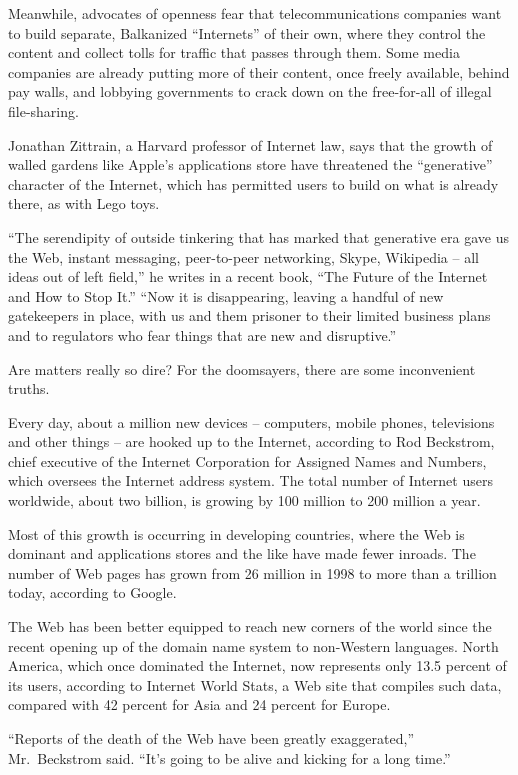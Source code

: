 ﻿\documentclass[12pt]{article}
\begin{document}
Meanwhile, advocates of openness fear that telecommunications companies want to build separate,
Balkanized ``Internets'' of their own, where they control the content and collect tolls for traffic
that passes through them. Some media companies are already putting more of their content, once
freely available, behind pay walls, and lobbying governments to crack down on the free-for-all of
illegal file-sharing.

Jonathan Zittrain, a Harvard professor of Internet law, says that the growth of walled gardens like
Apple's applications store have threatened the ``generative'' character of the Internet, which has
permitted users to build on what is already there, as with Lego toys.

``The serendipity of outside tinkering that has marked that generative era gave us the Web, instant
messaging, peer-to-peer networking, Skype, Wikipedia -- all ideas out of left field,'' he writes in
a recent book, ``The Future of the Internet and How to Stop It.'' ``Now it is disappearing, leaving
a handful of new gatekeepers in place, with us and them prisoner to their limited business plans and
to regulators who fear things that are new and disruptive.''

Are matters really so dire? For the doomsayers, there are some inconvenient truths.

Every day, about a million new devices -- computers, mobile phones, televisions and other things --
are hooked up to the Internet, according to Rod Beckstrom, chief executive of the Internet
Corporation for Assigned Names and Numbers, which oversees the Internet address system. The total
number of Internet users worldwide, about two billion, is growing by 100 million to 200 million a
year.

Most of this growth is occurring in developing countries, where the Web is dominant and applications
stores and the like have made fewer inroads. The number of Web pages has grown from 26 million in
1998 to more than a trillion today, according to Google.

The Web has been better equipped to reach new corners of the world since the recent opening up of
the domain name system to non-Western languages. North America, which once dominated the Internet,
now represents only 13.5 percent of its users, according to Internet World Stats, a Web site that
compiles such data, compared with 42 percent for Asia and 24 percent for Europe.

``Reports of the death of the Web have been greatly exaggerated,'' Mr.~Beckstrom said. ``It's going
to be alive and kicking for a long time.''
\end{document}
